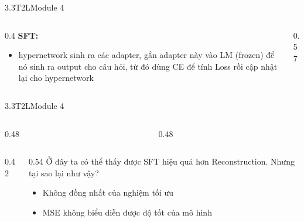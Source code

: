 \begin{frame}{3.3\quad T2L}{Module 4}
  \vspace{0.8em}
  \begin{columns}[c,onlytextwidth]
    \begin{column}{0.4\textwidth}
      \textbf{SFT:}
      \begin{itemize}
        \item hypernetwork sinh ra các adapter, gắn adapter này vào LM (frozen) để nó sinh
              ra output cho câu hỏi, từ đó dùng CE để tính Loss rồi cập nhật lại cho
              hypernetwork
      \end{itemize}
    \end{column}
    \begin{column}{0.57\textwidth}
      \centering{}
    \end{column}
  \end{columns}
\end{frame}

\begin{frame}{3.3\quad T2L}{Module 4}
  \begin{columns}[T,onlytextwidth]
    \begin{column}{0.48\textwidth}
      \\[0.2em]
    \end{column}
    \begin{column}{0.48\textwidth}
      \\[0.2em]
    \end{column}
  \end{columns}
  \vspace{0.6em}
  \begin{columns}[c,onlytextwidth]
    \begin{column}{0.42\textwidth}
      \centering{}
    \end{column}
    \begin{column}{0.54\textwidth}
      Ở đây ta có thể thấy được SFT hiệu quả hơn Reconstruction. Nhưng tại sao lại như vậy?
      \begin{itemize}\tightlist
        \item Không đồng nhất của nghiệm tối ưu
        \item MSE không biểu diễn được độ tốt của mô hình
      \end{itemize}
    \end{column}
  \end{columns}
\end{frame}

